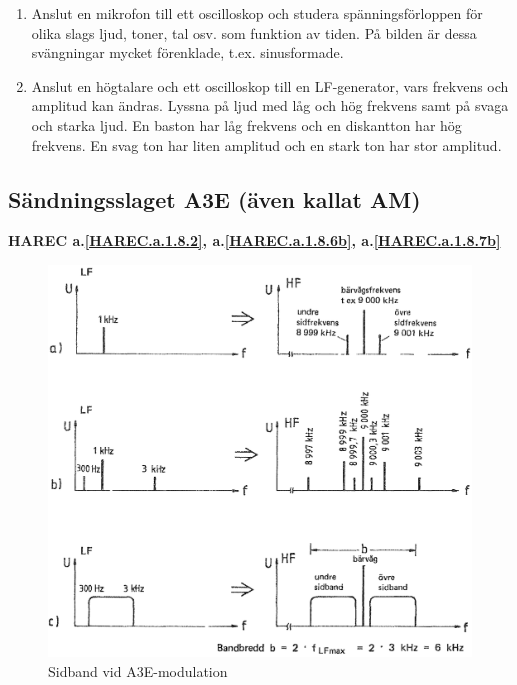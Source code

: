 \begin{enumerate}
\item Anslut en mikrofon till ett oscilloskop och studera spänningsförloppen
för olika slags ljud, toner, tal osv. som funktion av tiden. På bilden är
dessa svängningar mycket förenklade, t.ex. sinusformade.

\item Anslut en högtalare och ett oscilloskop till en LF-generator, vars
frekvens och amplitud kan ändras. Lyssna på ljud med låg och hög frekvens samt
på svaga och starka ljud. En baston har låg frekvens och en diskantton har hög
frekvens. En svag ton har liten amplitud och en stark ton har stor amplitud.
\end{enumerate}

\subsection{Sändningsslaget A3E (även kallat AM)}
\textbf{HAREC a.\ref{HAREC.a.1.8.2}, a.\ref{HAREC.a.1.8.6b}, a.\ref{HAREC.a.1.8.7b}\label{myHAREC.a.1.8.2}\label{myHAREC.a.1.8.6b}\label{myHAREC.a.1.8.7b}}

\begin{figure}
\includegraphics[width=\textwidth]{images/cropped_pdfs/bild_2_1-24.pdf}
\caption{Sidband vid A3E-modulation}
\label{fig:BildII1-24}
\end{figure}

